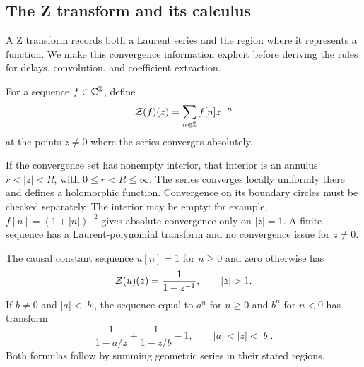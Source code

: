 \subsection{The Z transform and its calculus}
\label{sect2-defn-trans-Z}

A Z transform records both a Laurent series and the region where it
represents a function. We make this convergence information explicit before
deriving the rules for delays, convolution, and coefficient extraction.

\begin{defn}
\label{notation-60}
For a sequence $f\in\mathbb{C}^{\mathbb{Z}}$, define
\begin{equation}
\label{eq-trans-Z-defn}
 \mathcal{Z}(f)(z)=\sum_{n\in\mathbb{Z}}f[n]z^{-n}
\end{equation}
at the points $z\ne0$ where the series converges absolutely.
\end{defn}
If the convergence set has nonempty interior, that interior is an annulus
$r<|z|<R$, with $0\leq r<R\leq\infty$. The series converges locally
uniformly there and defines a holomorphic function. Convergence on its
boundary circles must be checked separately. The interior may be empty:
for example, $f[n]=(1+|n|)^{-2}$ gives absolute convergence only on $|z|=1$.
A finite sequence has a Laurent-polynomial transform and no convergence
issue for $z\ne0$.


\begin{exmp}
The causal constant sequence $u[n]=1$ for $n\geq0$ and zero otherwise has
\[
 \Zz(u)(z)=\frac1{1-z^{-1}},\qquad |z|>1.
\]
If $b\ne0$ and $|a|<|b|$, the sequence equal to $a^n$ for $n\geq0$
and $b^n$ for $n<0$ has transform
\[
 \frac1{1-a/z}+\frac1{1-z/b}-1,
 \qquad |a|<|z|<|b|.
\]
Both formulas follow by summing geometric series in their stated regions.
\end{exmp}


